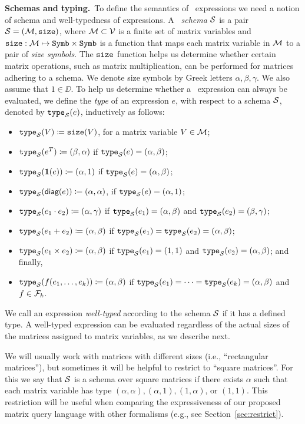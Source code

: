 \smallskip
\noindent
\textbf{Schemas and typing.}\,
To define the semantics of \lang\ expressions we need a notion of schema and well-typedness of expressions. A \lang\ \textit{schema} $\mathcal{S}$ is a pair $\mathcal{S}=(\mathcal{M},\texttt{size})$, where $\mathcal{M}\subset \mathcal{V}$ is a finite set of matrix variables and $\texttt{size}: \mathcal{M} \mapsto \texttt{Symb}\times \texttt{Symb}$ is a function that maps each matrix variable in $\mathcal{M}$ to a pair of \textit{size symbols}. The $\texttt{size}$ function helps us determine whether certain matrix operations, such as matrix multiplication, can be performed for matrices adhering to a schema. 
We denote size symbols by Greek letters $\alpha,\beta,\gamma$. We also assume that $1\in \DD$. To help us determine whether a \lang\ expression can always be evaluated, we define the \textit{type} of an expression $e$, with respect to a schema $\mathcal{S}$, denoted by $\texttt{type}_{\mathcal{S}}(e)$, inductively as follows:
\begin{itemize}
\item $\texttt{type}_{\mathcal{S}}(V)\coloneqq  \texttt{size}(V)$, for a matrix variable $V\in\mathcal{M}$;
\item $\texttt{type}_{\mathcal{S}}(e^T)\coloneqq  (\beta,\alpha)$ if $\texttt{type}_{\mathcal{S}}(e)=(\alpha,\beta)$;
\item $\texttt{type}_{\mathcal{S}}(\mathbf{1}(e))\coloneqq  (\alpha,1)$ if $\texttt{type}_{\mathcal{S}}(e)=(\alpha,\beta)$;
\item $\texttt{type}_{\mathcal{S}}(\textsf{diag}(e))\coloneqq  (\alpha,\alpha)$, if $\texttt{type}_{\mathcal{S}}(e)=(\alpha,1)$;
\item $\texttt{type}_{\mathcal{S}}(e_1 \cdot e_2)\coloneqq  (\alpha,\gamma)$ if  $\texttt{type}_{\mathcal{S}}(e_1)=(\alpha,\beta)$ and $\texttt{type}_{\mathcal{S}}(e_2)=(\beta,\gamma)$;
\item $\texttt{type}_{\mathcal{S}}(e_1 + e_2)\coloneqq (\alpha,\beta)$ if $\texttt{type}_{\mathcal{S}}(e_1)=\texttt{type}_{\mathcal{S}}(e_2)=(\alpha,\beta)$;
\item $\texttt{type}_{\mathcal{S}}(e_1\times e_2)\coloneqq (\alpha,\beta)$ if $\texttt{type}_{\mathcal{S}}(e_1)=(1,1)$ and $\texttt{type}_{\mathcal{S}}(e_2)=(\alpha,\beta)$; and finally,
\item $\texttt{type}_{\mathcal{S}}(f(e_1,\ldots ,e_k))\coloneqq  (\alpha,\beta)$ if $\texttt{type}_{\mathcal{S}}(e_1) = \cdots = \texttt{type}_{\mathcal{S}}(e_k) = (\alpha,\beta)$ and $f\in\mathcal{F}_k$.
\end{itemize}
We call an expression \textit{well-typed} according to the schema $\mathcal{S}$ if it has a defined type. A well-typed expression can be evaluated regardless of the actual sizes of the matrices assigned to matrix variables, as we describe next.

We will usually work with matrices with different sizes (i.e., ``rectangular matrices''), but sometimes it will be helpful to restrict to ``square matrices''. For this we say that $\mathcal{S}$ is a schema over square matrices if there exists $\alpha$ such that each matrix variable has type $(\alpha,\alpha),(\alpha,1),(1,\alpha)$, or $(1,1)$. This restriction will be useful when comparing the expressiveness of our proposed matrix query language with other formalisms (e.g., see Section~\ref{sec:restrict}). 

